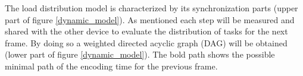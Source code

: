 The load distribution model is characterized by its synchronization parts (upper part of figure \ref{dynamic_model}). As mentioned each step will be measured and shared with the other device to evaluate the distribution of tasks for the next frame. By doing so a weighted directed acyclic graph (DAG) will be obtained  (lower part of figure \ref{dynamic_model}). The bold path shows the possible minimal path of the encoding time for the previous frame.\\